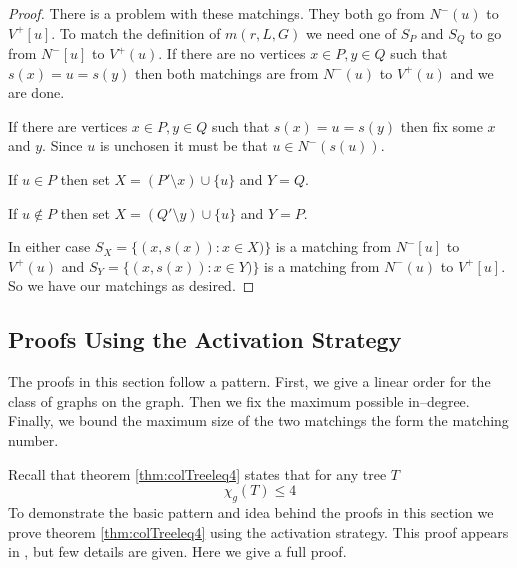 \begin{proof}
    There is a problem with these matchings. They both go from $N^-(u)$ to $V^+[u]$. To match the definition of $m(r,L,G)$ we need one of $S_P$ and $S_Q$ to go from $N^-[u]$ to $V^+(u)$. If there are no vertices $x\in P, y\in Q$ such that $s(x)=u=s(y)$ then both matchings are from $N^-(u)$ to $V^+(u)$ and we are done. 
    
    If there are vertices $x\in P, y\in Q$ such that $s(x)=u=s(y)$ then fix some $x$ and $y$. Since $u$ is unchosen it must be that $u \in N^-(s(u))$. 
    
    If $u\in P$ then set $X = (P'\setminus x) \cup\{u\}$ and $Y= Q$. 
    
    If $u\notin P$ then set $X = (Q'\setminus y) \cup\{u\}$ and $Y= P$.
    
    In either case $S_X= \{(x,s(x)):x\in X)\}$ is a matching from $N^-[u]$ to $V^+(u)$ and $S_Y= \{(x,s(x)):x\in Y)\}$ is a matching from $N^-(u)$ to $V^+[u]$. So we have our matchings as desired.
\end{proof}


\subsection{Proofs Using the Activation Strategy} \label{sec:actvStratProofs}
The proofs in this section follow a pattern. First, we give a linear order for the class of graphs on the graph. Then we fix the maximum possible in--degree. Finally, we bound the maximum size of the two matchings the form the matching number. 

Recall that theorem \ref{thm:colTreeleq4} states that for any tree $T$ \[\chi_g(T)\leq 4\]
To demonstrate the basic pattern and idea behind the proofs in this section we prove theorem \ref{thm:colTreeleq4} using the activation strategy. This proof appears in \cite{KIERSTEAD2000}, but few details are given. Here we give a full proof. 

